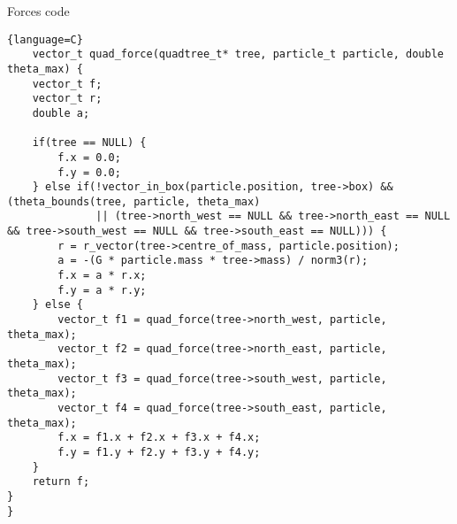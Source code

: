 \begin{center}
    Forces code
\end{center}
\begin{lstlisting}{language=C}
    vector_t quad_force(quadtree_t* tree, particle_t particle, double theta_max) {
    vector_t f;
    vector_t r;
    double a;

    if(tree == NULL) {
        f.x = 0.0;
        f.y = 0.0;
    } else if(!vector_in_box(particle.position, tree->box) && (theta_bounds(tree, particle, theta_max)
              || (tree->north_west == NULL && tree->north_east == NULL && tree->south_west == NULL && tree->south_east == NULL))) {
        r = r_vector(tree->centre_of_mass, particle.position);
        a = -(G * particle.mass * tree->mass) / norm3(r);
        f.x = a * r.x;
        f.y = a * r.y;
    } else {
        vector_t f1 = quad_force(tree->north_west, particle, theta_max);
        vector_t f2 = quad_force(tree->north_east, particle, theta_max);
        vector_t f3 = quad_force(tree->south_west, particle, theta_max);
        vector_t f4 = quad_force(tree->south_east, particle, theta_max);
        f.x = f1.x + f2.x + f3.x + f4.x;
        f.y = f1.y + f2.y + f3.y + f4.y;
    }
    return f;
}
}
\end{lstlisting}
